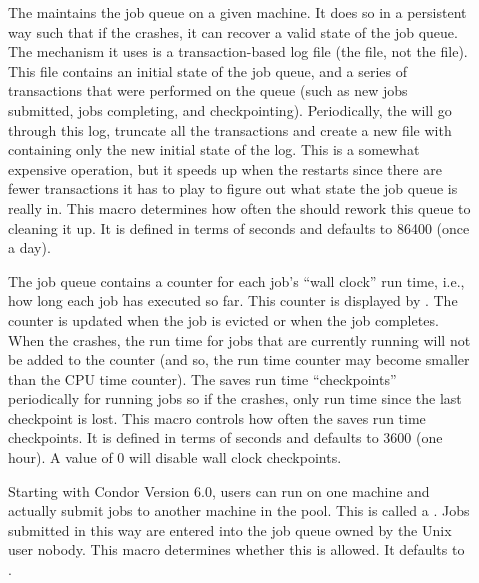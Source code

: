 \begin{description}
\item[] \label{param:QueueCleanInterval}
  The  maintains the job queue on a given machine.  It does so
  in a persistent way such that if the  crashes, it can recover
  a valid state of the job queue.  The mechanism it uses is a
  transaction-based log file (the  file,
  not the  file).  This file contains an initial
  state of the job queue, and a series of transactions that were
  performed on the queue (such as new jobs submitted, jobs completing,
  and checkpointing).  Periodically, the  will go through
  this log, truncate all the transactions and create a new file with
  containing only the new initial state of the log.
  This is a somewhat expensive operation,
  but it speeds up when the  restarts since there are
  fewer transactions it has to play to figure out what state the job
  queue is really in.  This macro determines how often the 
  should rework this queue to cleaning it up.  It is defined in terms of
  seconds and defaults to 86400 (once a day). 
  
\item[] \label{param:WallClockCkptInterval}
  The job queue contains a counter for each job's ``wall clock'' run
  time, i.e., how long each job has executed so far.  This counter is
  displayed by .  The counter is updated when the job is
  evicted or when the job completes.  When the  crashes, the run
  time for jobs that are currently running will not be added to the
  counter (and so, the run time counter may become smaller than the
  CPU time counter).  The  saves run time ``checkpoints''
  periodically for running jobs so if the  crashes, only run
  time since the last checkpoint is lost.  This macro controls how
  often the  saves run time checkpoints.  It is defined in terms
  of seconds and defaults to 3600 (one hour).  A value of 0 will
  disable wall clock checkpoints.

\item[] \label{param:AllowRemoteSubmit}
  Starting with Condor Version 6.0, users can run  on
  one machine and actually submit jobs to another machine in the
  pool.  This is called a .  Jobs submitted in
  this way are entered into the job queue owned by the Unix user
  nobody.
  This macro determines whether this is allowed.
  It defaults to .



\end{description}
